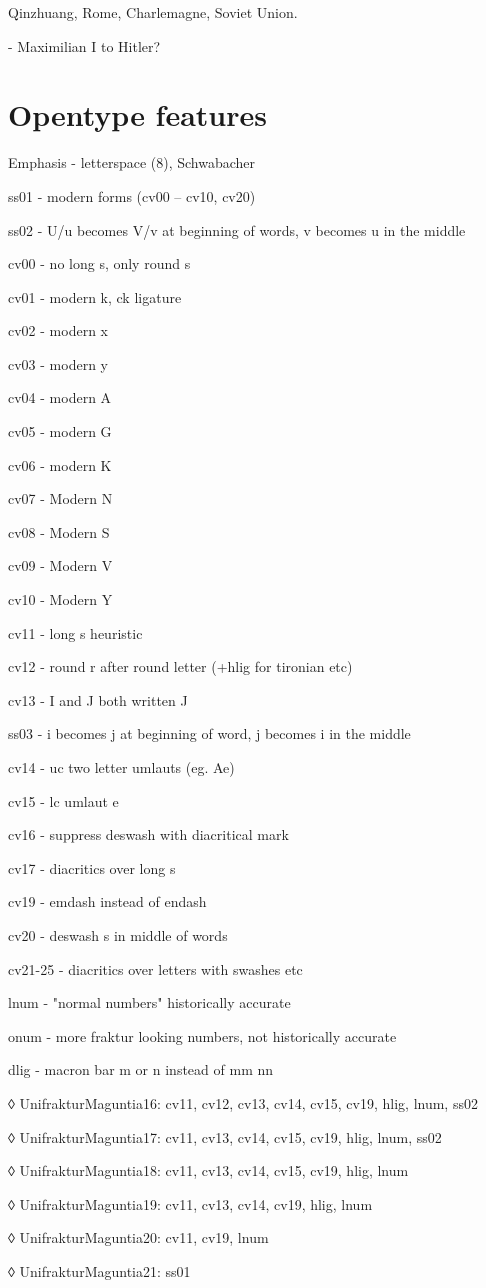 Qinzhuang, Rome, Charlemagne, Soviet Union.

- Maximilian I to Hitler?

\vfil\break

\section{Opentype features}

Emphasis - letterspace (8), Schwabacher

ss01 - modern forms (cv00 – cv10, cv20)

ss02 - U/u becomes V/v at beginning of words, v becomes u in the middle

cv00 - no long s, only round s

cv01 - modern k, ck ligature

cv02 - modern x

cv03 - modern y

cv04 - modern A

cv05 - modern G

cv06 - modern K

cv07 - Modern N

cv08 - Modern S

cv09 - Modern V

cv10 - Modern Y

cv11 - long s heuristic

cv12 - round r after round letter (+hlig for tironian etc)

cv13 - I and J both written J

ss03 - i becomes j at beginning of word, j becomes i in the middle

cv14 - uc two letter umlauts (eg. Ae)

cv15 - lc umlaut e

cv16 - suppress deswash with diacritical mark

cv17 - diacritics over long s

cv19 - emdash instead of endash

cv20 - deswash s in middle of words

cv21-25 - diacritics over letters with swashes etc

lnum - "normal numbers" historically accurate

onum - more fraktur looking numbers, not historically accurate

dlig - macron bar m or n instead of mm nn

\baselineskip
◊ UnifrakturMaguntia16: cv11, cv12, cv13, cv14, cv15, cv19, hlig, lnum, ss02

◊ UnifrakturMaguntia17: cv11, cv13, cv14, cv15, cv19, hlig, lnum, ss02

◊ UnifrakturMaguntia18: cv11, cv13, cv14, cv15, cv19, hlig, lnum

◊ UnifrakturMaguntia19: cv11, cv13, cv14, cv19, hlig, lnum

◊ UnifrakturMaguntia20: cv11, cv19, lnum

◊ UnifrakturMaguntia21: ss01
